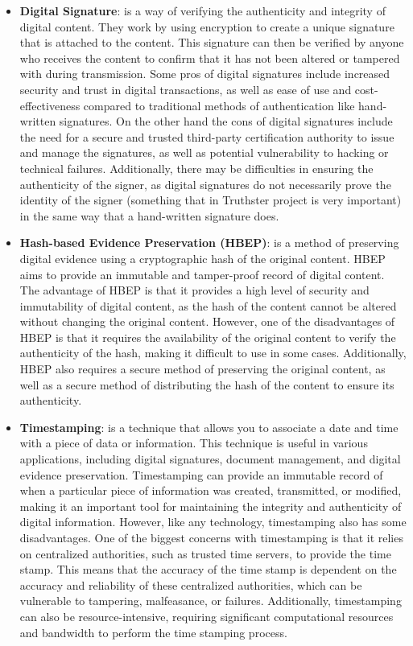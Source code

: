 \documentclass[target=mst,aauheader=]{thud}
\begin{document}
\begin{itemize}

    \item \textbf{Digital Signature}: is a way of verifying the authenticity and integrity of digital content. They work by using encryption to create a unique signature that is attached to the content. This signature can then be verified by anyone who receives the content to confirm that it has not been altered or tampered with during transmission. Some pros of digital signatures include increased security and trust in digital transactions, as well as ease of use and cost-effectiveness compared to traditional methods of authentication like hand-written signatures. On the other hand the cons of digital signatures include the need for a secure and trusted third-party certification authority to issue and manage the signatures, as well as potential vulnerability to hacking or technical failures. Additionally, there may be difficulties in ensuring the authenticity of the signer, as digital signatures do not necessarily prove the identity of the signer (something that in Truthster project is very important) in the same way that a hand-written signature does.
    \item \textbf{Hash-based Evidence Preservation (HBEP)}: is a method of preserving digital evidence using a cryptographic hash of the original content. HBEP aims to provide an immutable and tamper-proof record of digital content. The advantage of HBEP is that it provides a high level of security and immutability of digital content, as the hash of the content cannot be altered without changing the original content. However, one of the disadvantages of HBEP is that it requires the availability of the original content to verify the authenticity of the hash, making it difficult to use in some cases. Additionally, HBEP also requires a secure method of preserving the original content, as well as a secure method of distributing the hash of the content to ensure its authenticity.
    \item \textbf{Timestamping}: is a technique that allows you to associate a date and time with a piece of data or information. This technique is useful in various applications, including digital signatures, document management, and digital evidence preservation. Timestamping can provide an immutable record of when a particular piece of information was created, transmitted, or modified, making it an important tool for maintaining the integrity and authenticity of digital information. However, like any technology, timestamping also has some disadvantages. One of the biggest concerns with timestamping is that it relies on centralized authorities, such as trusted time servers, to provide the time stamp. This means that the accuracy of the time stamp is dependent on the accuracy and reliability of these centralized authorities, which can be vulnerable to tampering, malfeasance, or failures. Additionally, timestamping can also be resource-intensive, requiring significant computational resources and bandwidth to perform the time stamping process.

\end{itemize}
\end{document}
